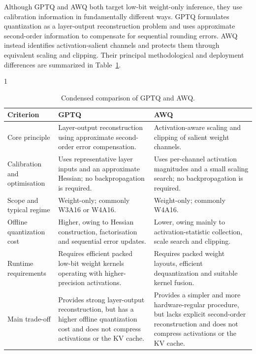 Although GPTQ and AWQ both target low-bit weight-only inference, they
use calibration information in fundamentally different ways. GPTQ
formulates quantization as a layer-output reconstruction problem and
uses approximate second-order information to compensate for sequential
rounding errors. AWQ instead identifies activation-salient channels and
protects them through equivalent scaling and clipping. Their principal
methodological and deployment differences are summarized in Table~\ref{tab:gptq-awq-comparison}.
\begin{table}[htbp]
\centering
\caption{Condensed comparison of GPTQ and AWQ.}
\label{tab:gptq-awq-comparison}

\begin{spacing}{1}
\small
\renewcommand{\arraystretch}{1.20}
\setlength{\tabcolsep}{5pt}

\begin{tabularx}{\textwidth}{
@{}
>{\raggedright\arraybackslash}p{}
>{\raggedright\arraybackslash}X
>{\raggedright\arraybackslash}X
@{}
}

\toprule
\textbf{Criterion}
&
\textbf{\acs{GPTQ}}
&
\textbf{\acs{AWQ}}
\\
\midrule

Core principle
&
Layer-output reconstruction using approximate second-order error
compensation.
&
Activation-aware scaling and clipping of salient weight channels.
\\

Calibration and optimisation
&
Uses representative layer inputs and an approximate Hessian; no
backpropagation is required.
&
Uses per-channel activation magnitudes and a small scaling search; no
backpropagation is required.
\\

Scope and typical regime
&
Weight-only; commonly W3A16 or W4A16.
&
Weight-only; commonly W4A16.
\\

Offline quantization cost
&
Higher, owing to Hessian construction, factorisation and sequential
error updates.
&
Lower, owing mainly to activation-statistic collection, scale search
and clipping.
\\

Runtime requirements
&
Requires efficient packed low-bit weight kernels operating with
higher-precision activations.
&
Requires packed weight layouts, efficient dequantization and suitable
kernel fusion.
\\

Main trade-off
&
Provides strong layer-output reconstruction, but has a higher offline
quantization cost and does not compress activations or the KV cache.
&
Provides a simpler and more hardware-regular procedure, but lacks
explicit second-order reconstruction and does not compress activations
or the KV cache.
\\

\bottomrule
\end{tabularx}
\end{spacing}
\end{table}

